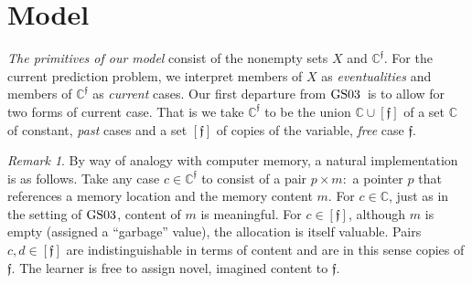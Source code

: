 \documentclass[ecta,nameyear,draft]{econsocart}
\newcommand{\novel}{\mathfrak f}
\newcommand{\mbbc}{{\mathds C}}
\newcommand{\mbbcp}{{\mathds C^{\novel}}}
\newcommand{\gsii}{$\textup{GS03}$}
\theoremstyle{plain}
\theoremstyle{remark}
\newtheorem*{remark*}{Remark}
\begin{document}
\section{Model}\label{sec-model}
\emph{The primitives of our model} consist of the nonempty sets
$X$ and $\mbbcp$.  For the current prediction problem, we interpret members of
$X$ as \emph{eventualities} and members of $\mbbcp$ as \emph{current} cases.
Our first departure from \gsii\ is to allow for two forms of current case. That
is we take $\mbbcp $ to be the union $\mbbc \cup [\novel]$ of a set $\mbbc$ of
constant, \emph{past} cases and a set $[\novel]$ of copies of the variable,
\emph{free} case $\novel$.
\begin{remark*}
  By way of analogy with computer memory, a natural implementation is as
  follows.  Take any case $c \in \mbbcp$ to consist of a pair $p \times m:$ a
  pointer $p$ that references a memory location and the memory content $m$. For
  $c\in \mbbc$, just as in the setting of \gsii, content of $m$ is meaningful. 
  For $c \in [\novel]$, although $m$ is empty (assigned a ``garbage'' value),
  the allocation is itself valuable. Pairs $c, d\in [\novel]$ are
  indistinguishable in terms of content and are in this sense copies of
  $\novel$. The learner is free to assign novel, imagined content to $\novel$.
\end{remark*}
\end{document}
